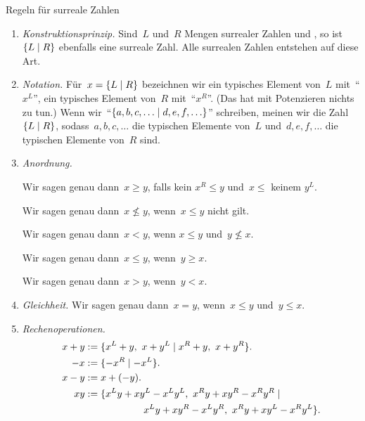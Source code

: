 \documentclass{../zirkelblatt}
\begin{document}
\begin{block}{Regeln für surreale Zahlen}
\renewcommand{\labelenumi}{\arabic{enumi}.}
\begin{enumerate}
\item \emph{Konstruktionsprinzip.}
Sind~$L$ und~$R$ Mengen surrealer Zahlen und , so ist~$\{ L \mathrel{|} R \}$ ebenfalls eine surreale
Zahl. Alle surrealen Zahlen entstehen auf diese Art.

\item \emph{Notation.}
Für~$x = \{ L \mathrel{|} R \}$ bezeichnen wir ein typisches Element von~$L$
mit~"`$x^L$"', ein typisches Element von~$R$ mit~"`$x^R$"'. (Das hat mit
Potenzieren nichts zu tun.) Wenn
wir~"`$\{ a,b,c,\ldots \mathrel{|} d,e,f,\ldots \}$"' schreiben, meinen wir die
Zahl~$\{ L \mathrel{|} R \}$, sodass~$a,b,c,\ldots$ die typischen Elemente von~$L$
und~$d,e,f,\ldots$ die typischen Elemente von~$R$ sind.

\item \emph{Anordnung.}

Wir sagen genau dann~$x \geq y$, falls kein $x^R \leq y$ und~$x \leq$
keinem $y^L$.

Wir sagen genau dann~$x \not\leq y$, wenn~$x \leq y$ nicht gilt.

Wir sagen genau dann~$x < y$, wenn $x \leq y$ und~$y \not\leq x$.

Wir sagen genau dann~$x \leq y$, wenn~$y \geq x$.

Wir sagen genau dann~$x > y$, wenn~$y < x$.

\item \emph{Gleichheit.}
Wir sagen genau dann~$x = y$, wenn~$x \leq y$ und~$y \leq x$.

\item \emph{Rechenoperationen.}
\begin{align*}
  x + y &:= \{ x^L + y,\ x + y^L \mathrel{|} x^R + y,\ x + y^R \}. \\
  -x &:= \{ -x^R \mathrel{|} -x^L \}. \\
  x - y &:= x + (-y). \\
  xy &:= \{ x^Ly + xy^L - x^Ly^L,\ x^Ry + xy^R - x^Ry^R \mathrel{|} \\&\qquad\qquad\qquad x^Ly + xy^R -
x^Ly^R,\ x^Ry + xy^L - x^Ry^L \}.
\end{align*}
\end{enumerate}
\end{block}
\end{document}
